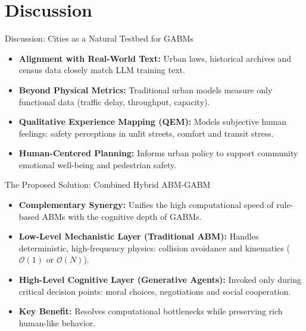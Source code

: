 \documentclass{beamer}
\begin{document}
\section{Discussion}

\begin{frame}{Discussion: Cities as a Natural Testbed for GABMs}
\begin{itemize}
    \item \textbf{Alignment with Real-World Text:} Urban laws, historical archives and census data closely match LLM training text.
    \medskip
    \item \textbf{Beyond Physical Metrics:} Traditional urban models measure only functional data (traffic delay, throughput, capacity).
    \medskip
    \item \textbf{Qualitative Experience Mapping (QEM):} Models subjective human feelings: safety perceptions in unlit streets, comfort and transit stress.
    \medskip
    \item \textbf{Human-Centered Planning:} Informs urban policy to support community emotional well-being and pedestrian safety.
\end{itemize}
\end{frame}

\begin{frame}{The Proposed Solution: Combined Hybrid ABM-GABM}
\begin{itemize}
    \item \textbf{Complementary Synergy:} Unifies the high computational speed of rule-based ABMs with the cognitive depth of GABMs.
    \medskip
    \item \textbf{Low-Level Mechanistic Layer (Traditional ABM):} Handles deterministic, high-frequency physics: collision avoidance and kinematics ($\mathcal{O}(1)$ or $\mathcal{O}(N)$).
    \medskip
    \item \textbf{High-Level Cognitive Layer (Generative Agents):} Invoked only during critical decision points: moral choices, negotiations and social cooperation.
    \medskip
    \item \textbf{Key Benefit:} Resolves computational bottlenecks while preserving rich human-like behavior.
\end{itemize}
\end{frame}
\end{document}
